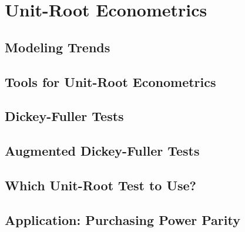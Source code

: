 
\chapter{Unit-Root Econometrics}
\label{ch:unit-root}

\section{Modeling Trends}
\label{sec:9.1}


\section{Tools for Unit-Root Econometrics}
\label{sec:9.2}


\section{Dickey-Fuller Tests}
\label{sec:9.3}


\section{Augmented Dickey-Fuller Tests}
\label{sec:9.4}


\section{Which Unit-Root Test to Use?}
\label{sec:9.5}


\section{Application: Purchasing Power Parity}
\label{sec:9.6}



